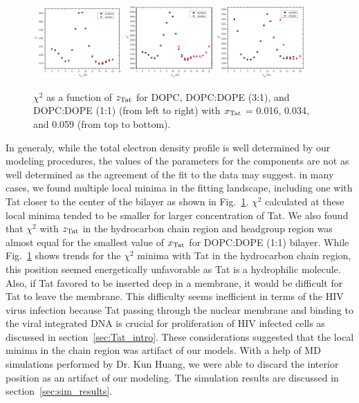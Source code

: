 \begin{figure}[htbp]
  \includegraphics[width=0.3\textwidth]{figures/Tat/SDP_Results/X2/DOPCDOPE1to1_Tat_62to1_3p0_X2}
  \includegraphics[width=0.3\textwidth]{figures/Tat/SDP_Results/X2/DOPCDOPE1to1_Tat_28to1_3p0_X2}
  \includegraphics[width=0.3\textwidth]{figures/Tat/SDP_Results/X2/DOPCDOPE1to1_Tat_16to1_3p0_X2}
  \caption{$\chi^2$ as a function of $z_\textrm{Tat}$ for DOPC, DOPC:DOPE (3:1), and 
  DOPC:DOPE (1:1) (from left to right) 
  with $x_\textrm{Tat}$ = 0.016, 0.034, and 0.059 (from top to bottom).}
  \label{fig:DOPC_Tat_X2}
\end{figure}

In generaly, while the total electron density profile is well determined by 
our modeling procedures, the values of the parameters for the components are 
not as well determined as the agreement of the fit to the data may suggest. 
in many cases, we found multiple local minima in the fitting landscape, 
including one with Tat closer to the center of the bilayer as
shown in Fig.~\ref{fig:DOPC_Tat_X2}. $\chi^2$ calculated at these local minima 
tended to be smaller for larger concentration of Tat. We also found
that $\chi^2$ with $z_\textrm{Tat}$ in the hydrocarbon chain region and headgroup
region was almost equal for the smallest value of $x_\textrm{Tat}$ for DOPC:DOPE (1:1)
bilayer.
While Fig.~\ref{fig:DOPC_Tat_X2} shows trends for the $\chi^2$ minima with Tat 
in the hydrocarbon chain region, this position seemed energetically 
unfavorable as Tat is a hydrophilic molecule. Also, if Tat favored to be 
inserted deep in a membrane, it would be difficult for Tat to
leave the membrane. This difficulty seems inefficient in terms of the HIV virus
infection because Tat passing through the nuclear membrane and binding
to the viral integrated DNA is crucial for proliferation of HIV infected cells as
discussed in section~\ref{sec:Tat_intro}. 
These considerations suggested that the local minima in the chain region
was artifact of our models.
With a help of MD simulations performed by Dr. Kun Huang,
we were able to discard the interior position as an artifact of our 
modeling. The simulation results are discussed in section~\ref{sec:sim_results}.

